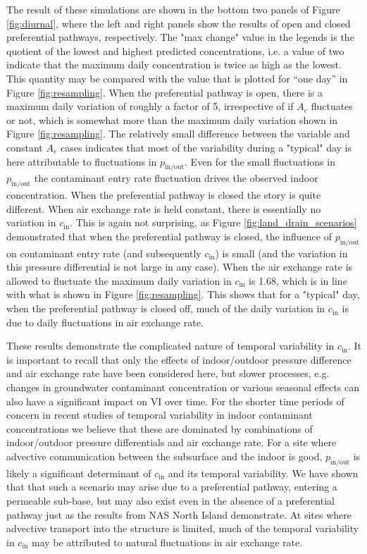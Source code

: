 \documentclass[journal=esthag,manuscript=article]{achemso}
\begin{document}
The result of these simulations are shown in the bottom two panels of Figure \ref{fig:diurnal}, where the left and right panels show the results of open and closed preferential pathways, respectively.
The "max change" value in the legends is the quotient of the lowest and highest predicted concentrations, i.e. a value of two indicate that the maximum daily concentration is twice as high as the lowest.
This quantity may be compared with the value that is plotted for “one day” in Figure \ref{fig:resampling}.
When the preferential pathway is open, there is a maximum daily variation of roughly a factor of 5, irrespective of if $A_e$ fluctuates or not, which is somewhat more than the maximum daily variation shown in Figure \ref{fig:resampling}.
The relatively small difference between the variable and constant $A_e$ cases indicates that most of the variability during a "typical" day is here attributable to fluctuations in $p_\mathrm{in/out}$.
Even for the small fluctuations in $p_\mathrm{in/out}$ the contaminant entry rate fluctuation drives the observed indoor concentration.
When the preferential pathway is closed the story is quite different.
When air exchange rate is held constant, there is essentially no variation in $c_\mathrm{in}$.
This is again not surprising, as Figure \ref{fig:land_drain_scenarios} demonstrated that when the preferential pathway is closed, the influence of $p_\mathrm{in/out}$ on contaminant entry rate (and subsequently $c_\mathrm{in}$) is small (and the variation in this pressure differential is not large in any case).
When the air exchange rate is allowed to fluctuate the maximum daily variation in $c_\mathrm{in}$ is 1.68, which is in line with what is shown in Figure \ref{fig:resampling}.
This shows that for a "typical" day, when the preferential pathway is closed off, much of the daily variation in $c_\mathrm{in}$ is due to daily fluctuations in air exchange rate.\par

These results demonstrate the complicated nature of temporal variability in $c_\mathrm{in}$.
It is important to recall that only the effects of indoor/outdoor pressure difference and air exchange rate have been considered here, but slower processes, e.g. changes in groundwater contaminant concentration or various seasonal effects can also have a significant impact on VI over time.
For the shorter time periods of concern in recent studies of temporal variability in indoor contaminant concentrations we believe that these are dominated by combinations of indoor/outdoor pressure differentials and air exchange rate.
For a site where advective communication between the subsurface and the indoor is good, $p_\mathrm{in/out}$ is likely a significant determinant of $c_\mathrm{in}$ and its temporal variability.
We have shown that that such a scenario may arise due to a preferential pathway, entering a permeable sub-base, but may also exist even in the absence of a preferential pathway just as the results from NAS North Island demonstrate.
At sites where advective transport into the structure is limited, much of the temporal variability in $c_\mathrm{in}$ may be attributed to natural fluctuations in air exchange rate.\par
\end{document}

